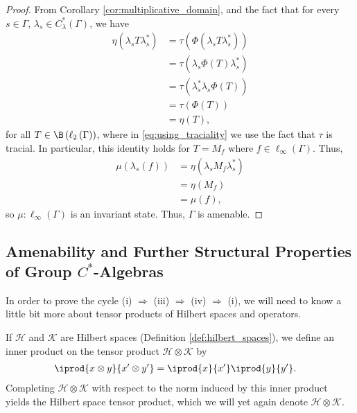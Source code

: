 \begin{proof}
  From Corollary \ref{cor:multiplicative_domain}, and the fact that for every $s\in\Gamma$, $\lambda_s\in C^{\ast}_{\lambda}\left( \Gamma \right)$, we have
  \begin{align*}
    \eta\left( \lambda_s T \lambda_s^{\ast} \right) &= \tau\left( \Phi\left( \lambda_s T \lambda_s^{\ast} \right) \right)\\
                                                    &= \tau\left( \lambda_s \Phi(T) \lambda_s^{\ast}\right)\\
                                                    &= \tau\left( \lambda_s^{\ast}\lambda_s\Phi(T) \right)\label{eq:using_traciality}\tag{\textasteriskcentered}\\
                                                    &= \tau\left( \Phi\left( T \right) \right)\\
                                                    &= \eta(T),
  \end{align*}
  for all $T\in \B\left( \ell_2\left( \Gamma \right) \right)$, where in \eqref{eq:using_traciality} we use the fact that $\tau$ is tracial. In particular, this identity holds for $T= M_f$ where $f\in \ell_{\infty}\left( \Gamma \right)$. Thus,
  \begin{align*}
    \mu\left( \lambda_s(f) \right) &= \eta\left( \lambda_sM_f\lambda_s^{\ast} \right)\\
                                   &= \eta\left( M_f \right)\\
                                   &= \mu\left( f \right),
  \end{align*}
  so $\mu\colon \ell_{\infty}\left( \Gamma \right)$ is an invariant state. Thus, $\Gamma$ is amenable.
\end{proof}

\subsection{Amenability and Further Structural Properties of Group $C^{\ast}$-Algebras}%
In order to prove the cycle (i) $\Rightarrow$ (iii) $\Rightarrow$ (iv) $\Rightarrow$ (i), we will need to know a little bit more about tensor products of Hilbert spaces and operators.\newline

If $\mathcal{H}$ and $\mathcal{K}$ are Hilbert spaces (Definition \ref{def:hilbert_spaces}), we define an inner product on the tensor product $\mathcal{H}\otimes \mathcal{K}$ by
\begin{align*}
  \iprod{x\otimes y}{x'\otimes y'} &= \iprod{x}{x'} \iprod{y}{y'}.
\end{align*}
Completing $\mathcal{H}\otimes \mathcal{K}$ with respect to the norm induced by this inner product yields the Hilbert space tensor product, which we will yet again denote $\mathcal{H}\otimes \mathcal{K}$.\newline

